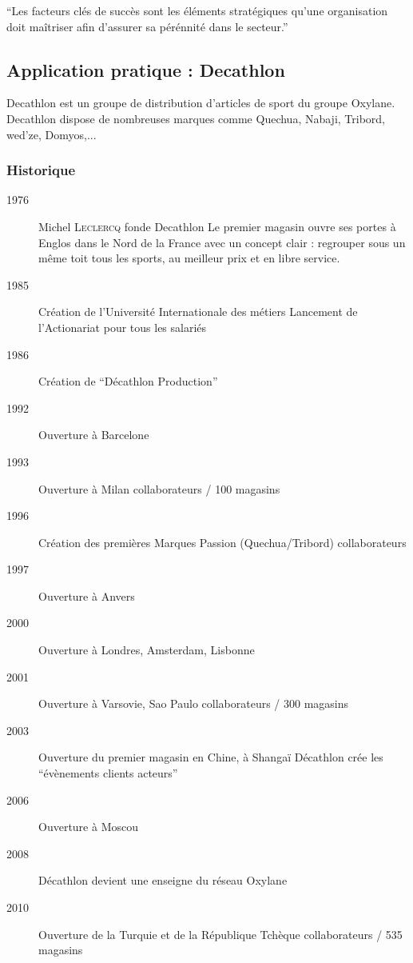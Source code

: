       \enquote{Les facteurs clés de succès sont les éléments stratégiques qu'une organisation doit maîtriser afin d'assurer sa pérénnité dans le secteur.}
  
  \clearpage
  
  \subsection{Application pratique : Decathlon}
  
  Decathlon est un groupe de distribution d'articles de sport du groupe Oxylane. Decathlon dispose de nombreuses marques comme Quechua, Nabaji, Tribord, wed'ze, Domyos,...
  
    \subsubsection{Historique}
      \begin{description}
	\item[1976] Michel \textsc{Leclercq} fonde Decathlon
	  \subitem Le premier magasin ouvre ses portes à Englos dans le Nord de la France avec un concept clair : regrouper sous un même toit tous les sports, au meilleur prix et en libre service.
	\item[1985] Création de l'Université Internationale des métiers
	  \subitem Lancement de l'Actionariat pour tous les salariés
	\item[1986] Création de \enquote{Décathlon Production}
	\item[1992] Ouverture à Barcelone
	\item[1993] Ouverture à Milan
	   collaborateurs / 100 magasins
	\item[1996] Création des premières Marques Passion (Quechua/Tribord)
	   collaborateurs
	\item[1997] Ouverture à Anvers
	\item[2000] Ouverture à Londres, Amsterdam, Lisbonne
	\item[2001] Ouverture à Varsovie, Sao Paulo
	   collaborateurs / 300 magasins
	\item[2003] Ouverture du premier magasin en Chine, à Shangaï
	  \subitem Décathlon crée les \enquote{évènements clients acteurs}
	\item[2006] Ouverture à Moscou
	\item[2008] Décathlon devient une enseigne du réseau Oxylane
	\item[2010] Ouverture de la Turquie et de la République Tchèque
	   collaborateurs / 535 magasins
      \end{description}

